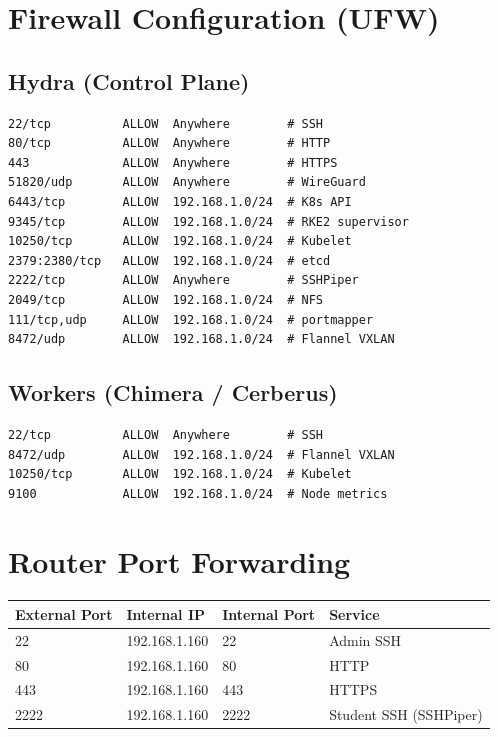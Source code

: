 \documentclass[11pt,a4paper]{article}
\begin{document}
\section{Firewall Configuration (UFW)}

\subsection{Hydra (Control Plane)}
\begin{lstlisting}[style=bash]
22/tcp          ALLOW  Anywhere        # SSH
80/tcp          ALLOW  Anywhere        # HTTP
443             ALLOW  Anywhere        # HTTPS
51820/udp       ALLOW  Anywhere        # WireGuard
6443/tcp        ALLOW  192.168.1.0/24  # K8s API
9345/tcp        ALLOW  192.168.1.0/24  # RKE2 supervisor
10250/tcp       ALLOW  192.168.1.0/24  # Kubelet
2379:2380/tcp   ALLOW  192.168.1.0/24  # etcd
2222/tcp        ALLOW  Anywhere        # SSHPiper
2049/tcp        ALLOW  192.168.1.0/24  # NFS
111/tcp,udp     ALLOW  192.168.1.0/24  # portmapper
8472/udp        ALLOW  192.168.1.0/24  # Flannel VXLAN
\end{lstlisting}

\subsection{Workers (Chimera / Cerberus)}
\begin{lstlisting}[style=bash]
22/tcp          ALLOW  Anywhere        # SSH
8472/udp        ALLOW  192.168.1.0/24  # Flannel VXLAN
10250/tcp       ALLOW  192.168.1.0/24  # Kubelet
9100            ALLOW  192.168.1.0/24  # Node metrics
\end{lstlisting}

\section{Router Port Forwarding}

\begin{table}[H]
\centering
\begin{tabular}{llll}
\toprule
\textbf{External Port} & \textbf{Internal IP} & \textbf{Internal Port} & \textbf{Service} \\
\midrule
22 & 192.168.1.160 & 22 & Admin SSH \\
80 & 192.168.1.160 & 80 & HTTP \\
443 & 192.168.1.160 & 443 & HTTPS \\
2222 & 192.168.1.160 & 2222 & Student SSH (SSHPiper) \\
\bottomrule
\end{tabular}
\end{table}
\end{document}

